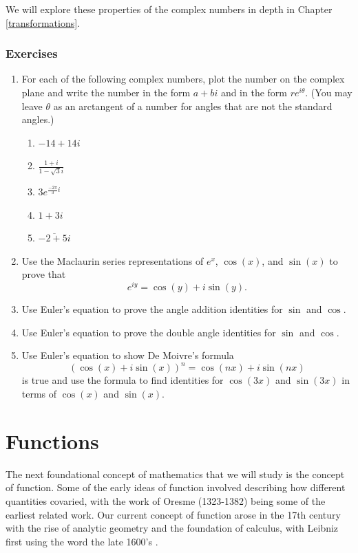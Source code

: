 \documentclass[
]{book}
\theoremstyle{definition}
\theoremstyle{definition}
\theoremstyle{definition}
\theoremstyle{definition}
\theoremstyle{remark}
\begin{document}
We will explore these properties of the complex numbers in depth in Chapter \ref{transformations}.

\hypertarget{exercises-15}{%
\subsection{Exercises}\label{exercises-15}}

\begin{enumerate}
\def\labelenumi{\arabic{enumi}.}
\item
  For each of the following complex numbers, plot the number on the complex plane and write the number in the form \(a+bi\) and in the form \(re^{i\theta}\). (You may leave \(\theta\) as an arctangent of a number for angles that are not the standard angles.)

  \begin{enumerate}
  \def\labelenumii{\alph{enumii}.}
  \item
    \(-14+14i\)
  \item
    \(\displaystyle{\frac{1+i}{1-\sqrt{3}i}}\)
  \item
    \(\displaystyle{3e^{\frac{-2\pi}{3}i}}\)
  \item
    \(1+3i\)
  \item
    \(\displaystyle{\overline{-2+5i}}\)
  \end{enumerate}
\item
  Use the Maclaurin series representations of \(e^x\), \(\cos(x)\), and \(\sin(x)\) to prove that \[e^{iy}=\cos(y) + i \sin(y).\]
\item
  Use Euler's equation to prove the angle addition identities for \(\sin\) and \(\cos\).
\item
  Use Euler's equation to prove the double angle identities for \(\sin\) and \(\cos\).
\item
  Use Euler's equation to show De Moivre's formula
  \[\left(\cos(x) + i \sin(x) \right)^n = \cos(nx) + i\sin(nx) \] is true and use the formula to find identities for \(\cos(3x)\) and \(\sin(3x)\) in terms of \(\cos(x)\) and \(\sin(x)\).
\end{enumerate}

\hypertarget{function}{%
\chapter{Functions}\label{function}}

The next foundational concept of mathematics that we will study is the concept of function. Some of the early ideas of function involved describing how different quantities covaried, with the work of Oresme (1323-1382) being some of the earliest related work. Our current concept of function arose in the 17th century with the rise of analytic geometry and the foundation of calculus, with Leibniz first using the word the late 1600's \citep{Ponte1992}.
\end{document}
